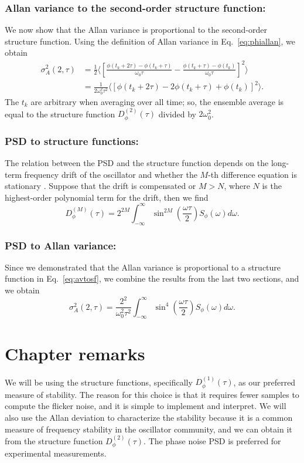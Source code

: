 \subsubsection*{Allan variance to the second-order structure function:}
%
We now show that the Allan variance is proportional to the second-order structure function. Using the definition of Allan variance in Eq.~\ref{eq:phiallan}, we obtain
%
\begin{align} \label{eq:avtosf}
\nonumber \sigma_A^2(2, \tau) &= \frac{1}{2}\bigg\langle \left[\frac{\phi(t_k+2\tau) - \phi(t_k+\tau)}{\omega_0\tau} - \frac{\phi(t_k+\tau) - \phi(t_k)}{\omega_0\tau}\right]^2 \bigg\rangle \\
&= \frac{1}{2\omega_0^2\tau^2} \langle\left[ \phi(t_k+2\tau) - 2\phi(t_k+\tau) + \phi(t_k) \right]^2\rangle.
\end{align}
%
The $t_k$ are arbitrary when averaging over all time; so, the ensemble average is equal to the structure function $D_\phi^{(2)}(\tau)$ divided by $2\omega_0^2$.

\subsubsection*{PSD to structure functions:}
%
The relation between the PSD and the structure function depends on the long-term frequency drift of the oscillator and whether the $M$-th difference equation is stationary \cite{Lindsey1976}. Suppose that the drift is compensated or $M > N$, where $N$ is the highest-order polynomial term for the drift, then we find
%
\begin{equation}
	D_\phi^{(M)}(\tau) = 2^{2M}\int_{-\infty}^{\infty} \sin^{2M}\left( \frac{\omega\tau}{2}\right) S_\phi(\omega) d\omega.
\end{equation}

\subsubsection*{PSD to Allan variance:}
%
Since we demonstrated that the Allan variance is proportional to a structure function in Eq.~\ref{eq:avtosf}, we combine the results from the last two sections, and we obtain
%
\begin{equation}
\sigma_A^2(2,\tau) = \frac{2^2}{\omega_0^2\tau^2} \int_{-\infty}^{\infty} \sin^4\left( \frac{\omega\tau}{2} \right) S_\phi(\omega) d\omega.
\end{equation}

\section{Chapter remarks} \label{sec:2conc}
%
We will be using the structure functions, specifically $D^{(1)}_\phi(\tau)$, as our preferred measure of stability. The reason for this choice is that it requires fewer samples to compute the flicker noise, and it is simple to implement and interpret. We will also use the Allan deviation to characterize the stability because it is a common measure of frequency stability in the oscillator community, and we can obtain it from the structure function $D_\phi^{(2)}(\tau)$. The phase noise PSD is preferred for experimental measurements.

